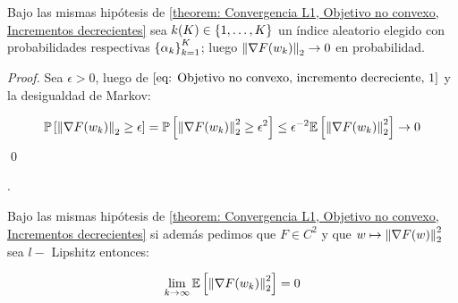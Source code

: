 \begin{corollary}
	Bajo las mismas hip\'otesis de \ref{theorem: Convergencia L1, Objetivo no convexo, Incrementos decrecientes} sea $k(K) \in \left\lbrace1, \dots, K\right\rbrace$ un \'indice aleatorio elegido con probabilidades respectivas $\left\lbrace\alpha_k\right\rbrace_{k=1}^K$; luego $\left\lVert\nabla F(w_k)\right\rVert_2 \rightarrow 0$ en probabilidad.
\end{corollary}

\begin{proof}
	Sea $\epsilon > 0$, luego de $\ref{eq: Objetivo no convexo, incremento decreciente, 1}$ y la desigualdad de Markov:
	
	\begin{equation*}
		\mathbb{P} \left[\left\lVert\nabla F (w_k)\right\rVert_2 \geq \epsilon\right] = \mathbb{P} \left[\left\lVert\nabla F (w_k)\right\rVert_2^2 \geq \epsilon^2\right] \leq \epsilon^{-2} \mathbb{E} \left[\left\lVert\nabla F(w_k)\right\rVert_2^2\right]  \rightarrow 0
	\end{equation*}
\qed
	
\end{proof}.

\begin{theorem}
	Bajo las mismas hip\'otesis de \ref{theorem: Convergencia L1, Objetivo no convexo, Incrementos decrecientes} si adem\'as pedimos que $F \in C^2$ y que $w \mapsto \left\lVert\nabla F (w)\right\rVert_2^2$ sea $l-$ Lipshitz entonces:
	
	\begin{equation}
		\lim\limits_{k \rightarrow \infty} \mathbb{E} \left[\left\lVert\nabla F (w_k)\right\rVert_2^2\right] = 0
	\end{equation}
	
\end{theorem}

